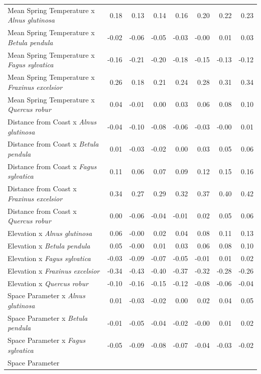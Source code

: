 \documentclass{article}\usepackage[]{graphicx}\usepackage[]{color}
\begin{document}
\begin{longtable}{lrrrrrrr}
  Mean Spring 
Temperature
x\textit{ Alnus glutinosa} & 0.18 & 0.13 & 0.14 & 0.16 & 0.20 & 0.22 & 0.23 \\ 
  Mean Spring 
Temperature
x\textit{ Betula pendula} & -0.02 & -0.06 & -0.05 & -0.03 & -0.00 & 0.01 & 0.03 \\ 
  Mean Spring 
Temperature
x\textit{ Fagus sylvatica} & -0.16 & -0.21 & -0.20 & -0.18 & -0.15 & -0.13 & -0.12 \\ 
  Mean Spring 
Temperature
x\textit{ Fraxinus excelsior} & 0.26 & 0.18 & 0.21 & 0.24 & 0.28 & 0.31 & 0.34 \\ 
  Mean Spring 
Temperature
x\textit{ Quercus robur} & 0.04 & -0.01 & 0.00 & 0.03 & 0.06 & 0.08 & 0.10 \\ 
  Distance from 
Coast
x\textit{ Alnus glutinosa} & -0.04 & -0.10 & -0.08 & -0.06 & -0.03 & -0.00 & 0.01 \\ 
  Distance from 
Coast
x\textit{ Betula pendula} & 0.01 & -0.03 & -0.02 & 0.00 & 0.03 & 0.05 & 0.06 \\ 
  Distance from 
Coast
x\textit{ Fagus sylvatica} & 0.11 & 0.06 & 0.07 & 0.09 & 0.12 & 0.15 & 0.16 \\ 
  Distance from 
Coast
x\textit{ Fraxinus excelsior} & 0.34 & 0.27 & 0.29 & 0.32 & 0.37 & 0.40 & 0.42 \\ 
  Distance from 
Coast
x\textit{ Quercus robur} & 0.00 & -0.06 & -0.04 & -0.01 & 0.02 & 0.05 & 0.06 \\ 
  Elevation
x\textit{ Alnus glutinosa} & 0.06 & -0.00 & 0.02 & 0.04 & 0.08 & 0.11 & 0.13 \\ 
  Elevation
x\textit{ Betula pendula} & 0.05 & -0.00 & 0.01 & 0.03 & 0.06 & 0.08 & 0.10 \\ 
  Elevation
x\textit{ Fagus sylvatica} & -0.03 & -0.09 & -0.07 & -0.05 & -0.01 & 0.01 & 0.02 \\ 
  Elevation
x\textit{ Fraxinus excelsior} & -0.34 & -0.43 & -0.40 & -0.37 & -0.32 & -0.28 & -0.26 \\ 
  Elevation
x\textit{ Quercus robur} & -0.10 & -0.16 & -0.15 & -0.12 & -0.08 & -0.06 & -0.04 \\ 
  Space Parameter
x\textit{ Alnus glutinosa} & 0.01 & -0.03 & -0.02 & 0.00 & 0.02 & 0.04 & 0.05 \\ 
  Space Parameter
x\textit{ Betula pendula} & -0.01 & -0.05 & -0.04 & -0.02 & -0.00 & 0.01 & 0.02 \\ 
  Space Parameter
x\textit{ Fagus sylvatica} & -0.05 & -0.09 & -0.08 & -0.07 & -0.04 & -0.03 & -0.02 \\ 
  Space Parameter

\end{longtable}
\end{document}
